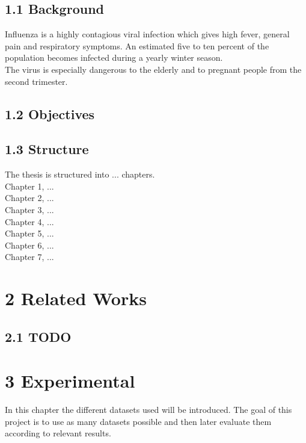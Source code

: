\documentclass[11pt]{report}
\begin{document}
\section*{1.1 Background}
Influenza is a highly contagious viral infection which gives high fever, general pain and respiratory symptoms. An estimated five to ten percent of the population becomes infected during a yearly winter season.\\ The virus is especially dangerous to the elderly and to pregnant people from the second trimester.


\section*{1.2 Objectives}

\section*{1.3 Structure}
The thesis is structured into ... chapters.\\
Chapter 1, ...\\
Chapter 2, ...\\
Chapter 3, ...\\
Chapter 4, ...\\
Chapter 5, ...\\
Chapter 6, ...\\
Chapter 7, ...\\

\chapter*{\vspace{-3cm}2 Related Works}

\section*{2.1 TODO}

\chapter*{\vspace{-3cm}3 Experimental}
In this chapter the different datasets used will be introduced. The goal of this project is to use as many datasets possible and then later evaluate them according to relevant results.
\end{document}
